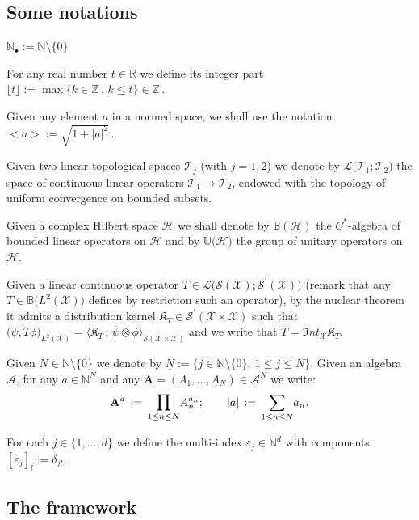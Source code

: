 \documentclass[12pt]{article}
\theoremstyle{definition}
\def\R{\mathbb{R}}
\def\Z{\mathbb{Z}}
\def\X{\mathcal X}
\def\Int{\mathfrak{I}\mathit{nt}}
\def\bigprod{{\text{\large{$\prod$}}}}
\def\Nb{\mathbb{N}_{\bullet}}
\numberwithin{equation}{section}
\begin{document}
\subsection{Some notations}\label{SS-notations}
\begin{enumerate}[{\rm a]}]
	\item $\Nb:=\mathbb{N}\setminus\{0\}$
	\item For any real number $t\in\R$ we define its integer  part 
	$
	\lfloor t\rfloor:=\max\{k\in\Z\,,\,k\leq t\}\in\Z\,.$
	\item Given any element $a$ in a normed space, we shall use the notation 
	$
	<a>:=\sqrt{1+|a|^2}\,.
	$
	\item Given two linear topological spaces $\mathcal{T}_j$ (with $j=1,2$) we denote by $\mathcal{L}\big(\mathcal{T}_1;\mathcal{T}_2\big)$ the space of continuous linear operators $\mathcal{T}_1\rightarrow\mathcal{T}_2$, endowed with the topology of uniform convergence on bounded subsets.
	\item Given a complex Hilbert space $\mathcal{H}$ we shall denote by $\mathbb{B}(\mathcal{H})$ the $C^*$-algebra of bounded linear operators on $\mathcal{H}$ and by $\mathbb{U}\big(\mathcal{H}\big)$ the group of unitary operators on $\mathcal{H}$.
	\item Given a linear continuous operator $T\in\mathcal{L}\big(\mathscr{S}(\X);\mathscr{S}^\prime(\X)\big)$ (remark that any $T\in\mathbb{B}\big(L^2(\X)\big)$ defines by restriction such an operator), by the nuclear theorem it admits a distribution kernel $\mathfrak{K}_T\in\mathscr{S}^\prime(\X\times\X)$ such that $\big(\psi,T\phi\big)_{L^2(\X)}=\big\langle\mathfrak{K}_T\,,\,\overline{\psi}\otimes\phi\big\rangle_{\mathscr{S}(\X\times\X)}$ and we write that $T=\Int_\X\mathfrak{K}_T$.
	\item Given $N\in\mathbb{N}\setminus\{0\}$ we denote by $\underline{N}:=\{j\in\mathbb{N}\setminus\{0\},\ 1\leq j\leq N\}$. Given an algebra $\mathcal{A}$, for any $a\in\mathbb{N}^N$ and any $\mathbf{A}=(A_1,\ldots,A_N)\in\mathcal{A}^N$ we write:
	$$\mathbf{A}^a\,:=\,\underset{1\leq n\leq N}{\bigprod}A_n^{a_n};\qquad|a|\,:=\,\underset{1\leq n\leq N}{\sum}a_n.$$
	\item For each $j\in\{1,\ldots,d\}$ we define the multi-index $\varepsilon_j\in\mathbb{N}^d$ with components $[\varepsilon_j]_l:=\delta_{jl}$.
\end{enumerate}

\subsection{The framework} 
\end{document}
